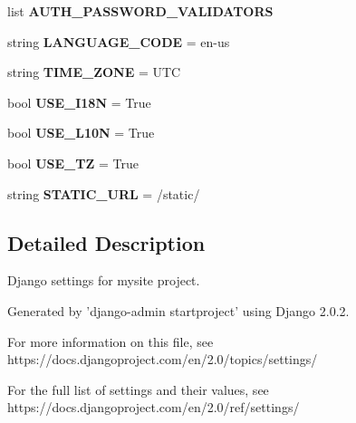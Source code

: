 \begin{DoxyCompactItemize}
\item 
list {\bfseries A\+U\+T\+H\+\_\+\+P\+A\+S\+S\+W\+O\+R\+D\+\_\+\+V\+A\+L\+I\+D\+A\+T\+O\+RS}
\item 
\mbox{\label{namespacemysite_1_1settings_a5aa2d89c65baaf7b41e64a82ed412029}} 
string {\bfseries L\+A\+N\+G\+U\+A\+G\+E\+\_\+\+C\+O\+DE} = \textquotesingle{}en-\/us\textquotesingle{}
\item 
\mbox{\label{namespacemysite_1_1settings_a8166ffe52ad58ff798949b613c9b5b2c}} 
string {\bfseries T\+I\+M\+E\+\_\+\+Z\+O\+NE} = \textquotesingle{}U\+TC\textquotesingle{}
\item 
\mbox{\label{namespacemysite_1_1settings_ab15c018acd6d7b21aaa53653fec903ef}} 
bool {\bfseries U\+S\+E\+\_\+\+I18N} = True
\item 
\mbox{\label{namespacemysite_1_1settings_af031ef2eb10f196cacefa65337e5a21d}} 
bool {\bfseries U\+S\+E\+\_\+\+L10N} = True
\item 
\mbox{\label{namespacemysite_1_1settings_a34c32078df8ac40575a4828411c667d5}} 
bool {\bfseries U\+S\+E\+\_\+\+TZ} = True
\item 
\mbox{\label{namespacemysite_1_1settings_a2aa5b2f0ed54dd3f8965ca2786f7fc27}} 
string {\bfseries S\+T\+A\+T\+I\+C\+\_\+\+U\+RL} = \textquotesingle{}/static/\textquotesingle{}
\end{DoxyCompactItemize}


\subsection{Detailed Description}
\begin{DoxyVerb}Django settings for mysite project.

Generated by 'django-admin startproject' using Django 2.0.2.

For more information on this file, see
https://docs.djangoproject.com/en/2.0/topics/settings/

For the full list of settings and their values, see
https://docs.djangoproject.com/en/2.0/ref/settings/
\end{DoxyVerb}
 

